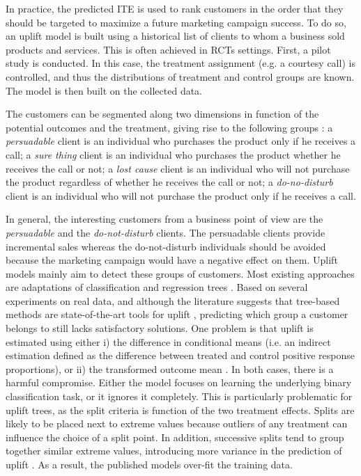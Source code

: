 \documentclass{article}
\begin{document}
In practice, the predicted ITE is used to rank customers in the order that they should be targeted to maximize a future marketing campaign success. To do so, an uplift model is built using a historical list of clients to whom a business sold products and services. This is often achieved in RCTs settings.
First, a pilot study is conducted. In this case, the treatment assignment (e.g. a courtesy call) is controlled, and thus the distributions of treatment and control groups are known. The model is then built on the collected data.

The customers can be segmented along two dimensions in function of the potential outcomes and the treatment, giving rise to the following groups \citep{kane2014mining} : a \textit{persuadable} client is an individual who purchases the product only if he receives a call; a \textit{sure thing} client is an individual who purchases the product whether he receives the call or not; a \textit{lost cause} client is an individual who will not purchase the product regardless of whether he receives the call or not; a \textit{do-no-disturb} client is an individual who will not purchase the product only if he receives a call.

In general, the interesting customers from a business point of view are the \textit{persuadable} and the \textit{do-not-disturb} clients. The persuadable clients provide incremental sales whereas the do-not-disturb individuals should be avoided because the marketing campaign would have a negative effect on them. Uplift models mainly aim to detect these groups of customers. Most existing approaches are adaptations of classification and regression trees \citep{radcliffe2011real, jaskowski2012uplift, guelman2012random}. Based on several experiments on real data, and although the literature suggests that tree-based methods are state-of-the-art tools for uplift \citep{soltys2015ensemble}, predicting which group a customer belongs to still lacks satisfactory solutions. One problem is that uplift is estimated using either i) the difference in conditional means (i.e. an indirect estimation defined as the difference between treated and control positive response proportions),  or ii) the transformed outcome mean \citep{athey2015machine}. In both cases, there is a harmful compromise. Either the model focuses on learning the underlying binary classification task, or it ignores it completely. This is particularly problematic for uplift trees, as the split criteria is function of the two treatment effects. Splits are likely to be placed next to extreme values because outliers of any treatment can influence the choice of a split point. In addition, successive splits tend to group together similar extreme values, introducing more variance in the prediction of uplift \citep{zhao2017practically}. As a result, the published models over-fit the training data. 
\end{document}
